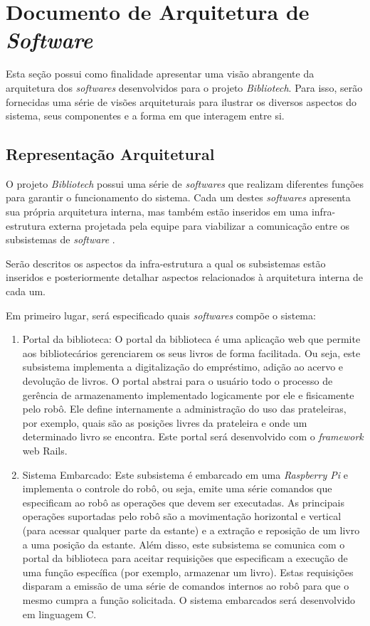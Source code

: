 \chapter[Documento de Arquitetura de Software]{Documento de Arquitetura de \textit{Software}}
Esta seção possui como finalidade apresentar uma visão abrangente da arquitetura dos \textit{softwares} desenvolvidos para o projeto \textit{Bibliotech}. Para isso, serão fornecidas uma série de visões arquiteturais para ilustrar os diversos aspectos do sistema, seus componentes e a forma em que interagem entre si.

\section{Representação Arquitetural}
O projeto \textit{Bibliotech} possui uma série de \textit{softwares} que realizam diferentes funções para garantir o funcionamento do sistema. Cada um destes \textit{softwares} apresenta sua própria arquitetura interna, mas também estão inseridos em uma infra-estrutura externa projetada pela equipe para viabilizar a comunicação entre os subsistemas de \textit{software} . 

Serão descritos os aspectos da infra-estrutura a qual os subsistemas estão inseridos e posteriormente detalhar aspectos relacionados à arquitetura interna de cada um.

Em primeiro lugar, será especificado quais \textit{softwares} compõe o sistema:

\begin{enumerate}
    \item Portal da biblioteca: O portal da biblioteca é uma aplicação web que permite aos bibliotecários gerenciarem os seus livros de forma facilitada. Ou seja, este subsistema implementa a digitalização do empréstimo, adição ao acervo e devolução de livros. O portal abstrai para o usuário todo o processo de gerência de armazenamento implementado logicamente por ele e fisicamente pelo robô. Ele define internamente a administração do uso das prateleiras, por exemplo, quais são as posições livres da prateleira e onde um determinado livro se encontra. Este portal será desenvolvido com o \textit{framework} web Rails.

    \item Sistema Embarcado: Este subsistema é embarcado em uma \textit{Raspberry Pi} e implementa o controle do robô, ou seja, emite uma série comandos que especificam ao robô as operações que devem ser executadas. As principais operações suportadas pelo robô são a movimentação horizontal e vertical (para acessar qualquer parte da estante) e a extração e reposição de um livro a uma posição da estante. Além disso, este subsistema se comunica com o portal da biblioteca para aceitar requisições que especificam a execução de uma função específica (por exemplo, armazenar um livro). Estas requisições disparam a emissão de uma série de comandos internos ao robô para que o mesmo cumpra a função solicitada. O sistema embarcados será desenvolvido em linguagem C.
\end{enumerate}

